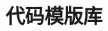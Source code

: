 \documentclass[9pt]{article}
\begin{document}
\title{\bf 代码模版库}
\date{}

\maketitle

\begin{multicols}{2}
\tableofcontents
\end{multicols}

\newpage

\columnseprule=0.25pt

\begin{multicols}{2}


\end{multicols}
\end{document}

